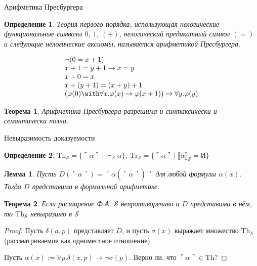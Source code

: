 \documentclass[aspectratio=169]{beamer}
\newtheorem{thm}{Теорема}[section]
\newtheorem{dfn}{Определение}[section]
\newtheorem{lmm}{Лемма}[section]
\begin{document}
\begin{frame}{Арифметика Пресбургера}
\begin{dfn}Теория первого порядка, использующая нелогические функциональные символы $0$, $1$, $(+)$, нелогический
предикатный символ $(=)$ и следующие нелогические аксиомы, называется арифметикой Пресбургера.

$$\begin{array}{l}
\neg (0 = x + 1) \\
x + 1 = y + 1 \rightarrow x = y\\
x + 0 = x \\
x + (y + 1) = (x + y) + 1\\
(\varphi(0) \with \forall x.\varphi(x) \rightarrow \varphi(x+1)) \rightarrow \forall y.\varphi(y)
\end{array}$$\end{dfn}

\begin{thm}Арифметика Пресбургера разрешима и синтаксически и семантически полна.\end{thm}
\end{frame}

\begin{frame}{Невыразимость доказуемости}
\begin{dfn}
$\text{Th}_\mathcal{S} = \{ \ulcorner\alpha\urcorner\ |\ \vdash_\mathcal{S}\alpha \}$; 
$\text{Tr}_\mathcal{S} = \{ \ulcorner\alpha\urcorner\ |\ \llbracket\alpha\rrbracket_\mathcal{S} = \text{И} \}$
\end{dfn}

\begin{lmm}Пусть $D(\ulcorner\alpha\urcorner) = \ulcorner\alpha(\overline{\ulcorner\alpha\urcorner})\urcorner$ для
любой формулы $\alpha(x)$. Тогда $D$ представима в формальной арифметике.
\end{lmm}


\begin{thm}Если расширение Ф.А. $\mathcal{S}$ непротиворечиво и $D$ представима в нём, то $\text{Th}_\mathcal{S}$ невыразимо в $\mathcal{S}$\end{thm}

\begin{proof}Пусть $\delta(a,p)$ представляет $D$, и пусть $\sigma(x)$ выражает множество $\text{Th}_\mathcal{S}$ (рассматриваемое как
одноместное отношение).

Пусть $\alpha(x) := \forall p.\delta(x,p)\rightarrow\neg\sigma(p)$. Верно ли, что $\ulcorner\alpha\urcorner\in\text{Th}$?
\end{proof}
\end{frame}
\end{document}
